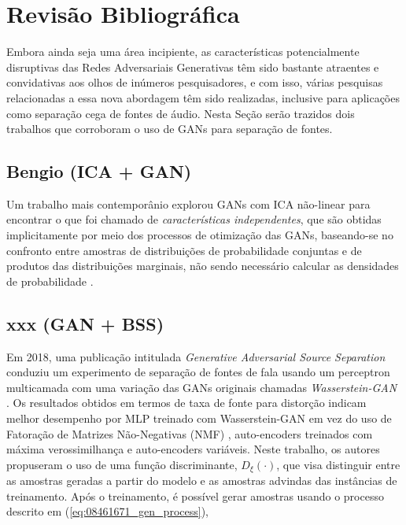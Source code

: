 \section{Revisão Bibliográfica}
\label{sec:gan_for_bss_bib_review}

Embora ainda seja uma área incipiente, as características potencialmente disruptivas das Redes Adversariais Generativas têm sido bastante atraentes e convidativas aos olhos de inúmeros pesquisadores, e com isso, várias pesquisas relacionadas a essa nova abordagem têm sido realizadas, inclusive para aplicações como separação cega de fontes de áudio. Nesta Seção serão trazidos dois trabalhos que corroboram o uso de GANs para separação de fontes.

\subsection{Bengio (ICA + GAN)}
\label{subsec:gan_for_bss_ica_gan}

Um trabalho mais contemporânio explorou GANs com ICA não-linear para encontrar o que foi chamado de \textit{características independentes}, que são obtidas implicitamente por meio dos processos de otimização das GANs, baseando-se no confronto entre amostras de distribuições de probabilidade conjuntas e de produtos das distribuições marginais, não sendo necessário calcular as densidades de probabilidade \citep{brakel2017learning}.



\subsection{xxx (GAN + BSS)}
\label{subsec:gan_for_bss_gan_bss}

Em 2018, uma publicação intitulada \textit{Generative Adversarial Source Separation} \citep{8461671} conduziu um experimento de separação de fontes de fala usando um perceptron multicamada com uma variação das GANs originais chamadas \textit{Wasserstein-GAN} \citep{arjovsky2017wasserstein}. Os resultados obtidos em termos de taxa de fonte para distorção indicam melhor desempenho por MLP treinado com Wasserstein-GAN em vez do uso de Fatoração de Matrizes Não-Negativas (NMF) \citep{lee1999learning}, auto-encoders treinados com máxima verossimilhança e auto-encoders variáveis. Neste trabalho, os autores propuseram o uso de uma função discriminante, $D_{\xi}\left(\cdot\right)$, que visa distinguir entre as amostras geradas a partir do modelo e as amostras advindas das instâncias de treinamento. Após o treinamento, é possível gerar amostras usando o processo descrito em (\ref{eq:08461671_gen_process}),

